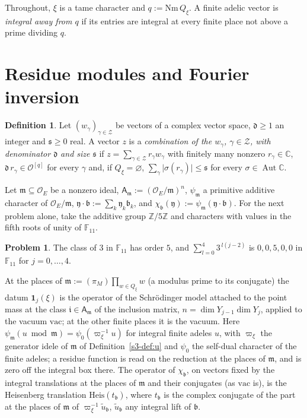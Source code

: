 \documentclass[reqno]{amsart}
\theoremstyle{definition}
\newtheorem{problem}{Problem}[section]
\newtheorem{definition}{Definition}[section]
\theoremstyle{plain}
\newcommand{\Z}{\mathbb{Z}}
\newcommand{\C}{\mathbb{C}}
\newcommand{\F}{\mathbb{F}}
\newcommand{\Oc}{\mathcal{O}}
\newcommand{\Aut}{\operatorname{Aut}}
\newcommand{\Nm}{\mathrm{Nm}\,}
\newcommand{\Heis}{\mathrm{Heis}}
\newcommand{\vac}{\mathrm{vac}}
\begin{document}
Throughout, \(\xi\) is a tame character and \(q:=\Nm Q_\xi\).  A finite adelic vector is \emph{integral away from \(q\)} if its entries are integral at every finite place not above a prime dividing \(q\).

\section{Residue modules and Fourier inversion}\label{sec:residues}

\begin{definition}\label{def:combination}
Let \((w_\gamma)_{\gamma\in\mathcal Z}\) be vectors of a complex vector space, \(\mathfrak d\ge1\) an integer and \(\mathfrak s\ge0\) real.  A vector \(z\) is a \emph{combination of the \(w_\gamma\), \(\gamma\in\mathcal Z\), with denominator \(\mathfrak d\) and size \(\mathfrak s\)} if \(z=\sum_{\gamma\in\mathcal Z}r_\gamma w_\gamma\) with finitely many nonzero \(r_\gamma\in\C\), \(\mathfrak d\,r_\gamma\in\Oc^{[q]}\) for every \(\gamma\) and, if \(Q_\xi=\varnothing\), \(\sum_\gamma\lvert\sigma(r_\gamma)\rvert\le\mathfrak s\) for every \(\sigma\in\Aut\C\).
\end{definition}

Let \(\mathfrak m\subseteq\Oc_E\) be a nonzero ideal, \(\mathsf A_{\mathfrak m}:=(\Oc_E/\mathfrak m)^n\), \(\psi_{\mathfrak m}\) a primitive additive character of \(\Oc_E/\mathfrak m\), \(\mathfrak y\cdot\mathfrak b:=\sum_k\mathfrak y_k\mathfrak b_k\), and \(\chi_{\mathfrak b}(\mathfrak y):=\psi_{\mathfrak m}(\mathfrak y\cdot\mathfrak b)\).  For the next problem alone, take the additive group \(\Z/5\Z\) and characters with values in the fifth roots of unity of \(\F_{11}\).

\begin{problem}\label{pr:fourier}
The class of \(3\) in \(\F_{11}\) has order \(5\), and \(\sum_{l=0}^{4}3^{\,l(j-2)}\) is \(0,0,5,0,0\) in \(\F_{11}\) for \(j=0,\dots,4\).
\end{problem}

At the places of \(\mathfrak m:=(\pi_M)\prod_{w\in Q_\xi}w\) (a modulus prime to its conjugate) the datum \(\mathbf 1_j(\xi)\) is the operator of the Schr\"odinger model attached to the point mass at the class \(\mathfrak i\in \mathsf A_{\mathfrak m}\) of the inclusion matrix, \(n=\dim Y_{j-1}\dim Y_j\), applied to the vacuum \(\vac\); at the other finite places it is the vacuum.  Here \(\psi_{\mathfrak m}(u\bmod\mathfrak m)=\psi_0(\varpi_\xi^{-1}u)\) for integral finite adeles \(u\), with \(\varpi_\xi\) the generator idele of \(\mathfrak m\) of Definition~\ref{s3-def:u} and \(\psi_0\) the self-dual character of the finite adeles; a residue function is read on the reduction at the places of \(\mathfrak m\), and is zero off the integral box there.  The operator of \(\chi_{\mathfrak b}\), on vectors fixed by the integral translations at the places of \(\mathfrak m\) and their conjugates (as \(\vac\) is), is the Heisenberg translation \(\Heis(t_{\mathfrak b})\), where \(t_{\mathfrak b}\) is the complex conjugate of the part at the places of \(\mathfrak m\) of \(\varpi_\xi^{-1}\tilde u_{\mathfrak b}\), \(\tilde u_{\mathfrak b}\) any integral lift of \(\mathfrak b\).
\end{document}

